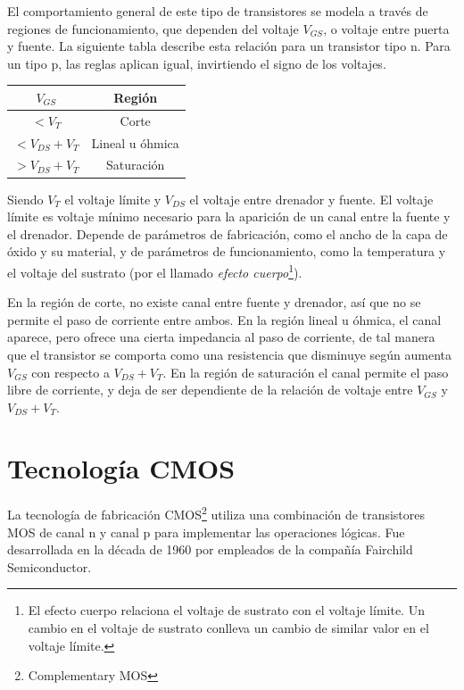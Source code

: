 \documentclass[12pt]{report} %
\begin{document}
	El comportamiento general de este tipo de transistores se modela a través de regiones de funcionamiento, que dependen del voltaje $V_{GS}$, o voltaje entre puerta y fuente.
	La siguiente tabla describe esta relación para un transistor tipo n. Para un tipo p, las reglas aplican igual, invirtiendo el signo de los voltajes.
	
	\begin{table}[H]
		\begin{tabular}{|c|c|}
			\hline
			$V_{GS}$ & Región \\
			\hline
			$< V_{T}$ & Corte \\
			\hline
			$< V_{DS} + V_{T}$ & Lineal u óhmica \\
			\hline
			$> V_{DS} + V_{T}$ & Saturación \\
			\hline
		\end{tabular}
	\end{table}

	Siendo $V_{T}$ el voltaje límite y $V_{DS}$ el voltaje entre drenador y fuente. El voltaje límite es voltaje mínimo necesario para la aparición de un canal entre la fuente y el drenador. Depende de parámetros de fabricación, como el ancho de la capa de óxido y su material, y de parámetros de funcionamiento, como la temperatura y el voltaje del sustrato (por el llamado \textit{efecto cuerpo}\footnote{El efecto cuerpo relaciona el voltaje de sustrato con el voltaje límite. Un cambio en el voltaje de sustrato conlleva un cambio de similar valor en el voltaje límite.}).
	
	En la región de corte, no existe canal entre fuente y drenador, así que no se permite el paso de corriente entre ambos. En la región lineal u óhmica, el canal aparece, pero ofrece una cierta impedancia al paso de corriente, de tal manera que el transistor se comporta como una resistencia que disminuye según aumenta $V_{GS}$ con respecto a $V_{DS} + V_{T}$. En la región de saturación el canal permite el paso libre de corriente, y deja de ser dependiente de la relación de voltaje entre $V_{GS}$ y $V_{DS} + V_{T}$.
	
	\section{Tecnología CMOS}
	
	La tecnología de fabricación CMOS\footnote{Complementary MOS} utiliza una combinación de transistores MOS de canal n y canal p para implementar las operaciones lógicas. Fue desarrollada en la década de 1960 por empleados de la compañía Fairchild Semiconductor\cite{cmos-fairchild}.
	
\end{document}
